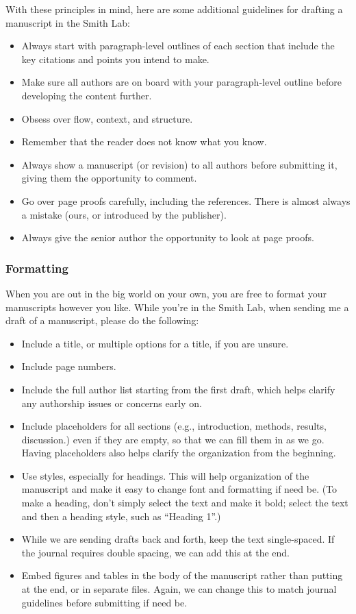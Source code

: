 \documentclass[letterpaper,12pt,oneside]{memoir}
\begin{document}
With these principles in mind, here are some additional guidelines for drafting a manuscript in the Smith Lab:

\begin{itemize}[noitemsep,nolistsep]
\item Always start with paragraph-level outlines of each section that include the key citations and points you intend to make.
\item Make sure all authors are on board with your paragraph-level outline before developing the content further.
\item Obsess over flow, context, and structure.
\item Remember that the reader does not know what you know.
\item Always show a manuscript (or revision) to all authors before submitting it, giving them the opportunity to comment.
\item Go over page proofs carefully, including the references. There is almost always a mistake (ours, or introduced by the publisher).
\item Always give the senior author the opportunity to look at page proofs.
\end{itemize}


\subsubsection{Formatting}

When you are out in the big world on your own, you are free to format your manuscripts however you like. While you're in the Smith Lab, when sending me a draft of a manuscript, please do the following:

\begin{itemize}[noitemsep,nolistsep]
\item Include a title, or multiple options for a title, if you are unsure. 
\item Include page numbers.
\item Include the full author list starting from the first draft, which helps clarify any authorship issues or concerns early on.
\item Include placeholders for all sections (e.g., introduction, methods, results, discussion.) even if they are empty, so that we can fill them in as we go. Having placeholders also helps clarify the organization from the beginning.
\item Use styles, especially for headings. This will help organization of the manuscript and make it easy to change font and formatting if need be. (To make a heading, don't simply select the text and make it bold; select the text and then a heading style, such as ``Heading 1''.)
\item While we are sending drafts back and forth, keep the text single-spaced. If the journal requires double spacing, we can add this at the end.
\item Embed figures and tables in the body of the manuscript rather than putting at the end, or in separate files. Again, we can change this to match journal guidelines before submitting if need be.
\end{itemize}
\end{document}

